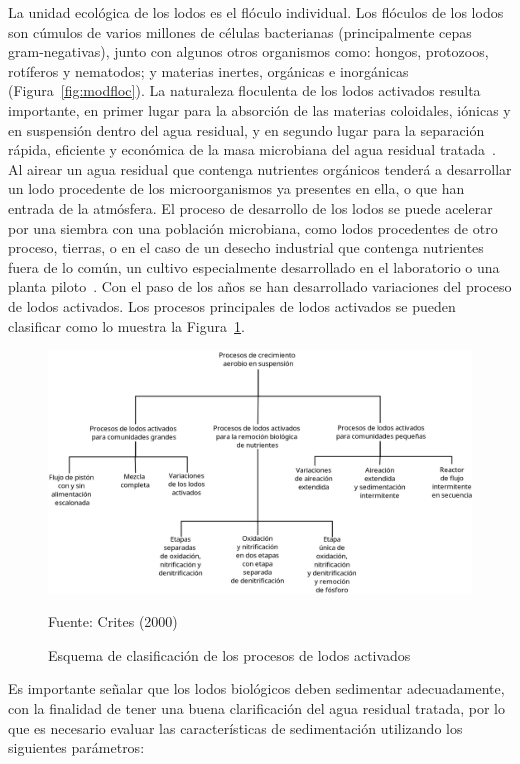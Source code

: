 La unidad ecológica de los lodos es el flóculo individual. Los flóculos de los lodos son cúmulos de varios millones de células bacterianas (principalmente cepas gram-negativas), junto con algunos otros organismos como: hongos, protozoos, rotíferos y nematodos; y materias inertes, orgánicas e inorgánicas (Figura~\ref{fig:modfloc}). La naturaleza floculenta de los lodos activados resulta importante, en primer lugar para la absorción de las materias coloidales, iónicas y en suspensión dentro del agua residual, y en segundo lugar para la separación rápida, eficiente y económica de la masa microbiana del agua residual tratada~\citep{ashok16}. Al airear un agua residual que contenga nutrientes orgánicos tenderá a desarrollar un lodo procedente de los microorganismos ya presentes en ella, o que han entrada de la atmósfera. El proceso de desarrollo de los lodos se puede acelerar por una siembra con una población microbiana, como lodos procedentes de otro proceso, tierras, o en el caso de un desecho industrial que contenga nutrientes fuera de lo común, un cultivo especialmente desarrollado en el laboratorio o una planta piloto~\citep{winkler96}.
Con el paso de los años se han desarrollado variaciones del proceso de lodos activados. Los procesos principales de lodos activados se pueden clasificar como lo muestra la Figura~\ref{fig:procesosaer}.\\
	\begin{figure}[!h]
		\centering
		\includegraphics[scale=0.25]{Clasificacion_procesos_aer.png}
		\caption{Esquema de clasificación de los procesos de lodos activados}
		\small{Fuente: Crites (2000)}
		\label{fig:procesosaer}
	\end{figure}
Es importante señalar que los lodos biológicos deben sedimentar adecuadamente, con la finalidad de tener una buena clarificación del agua residual tratada, por lo que es necesario evaluar las características de sedimentación utilizando los siguientes parámetros:
